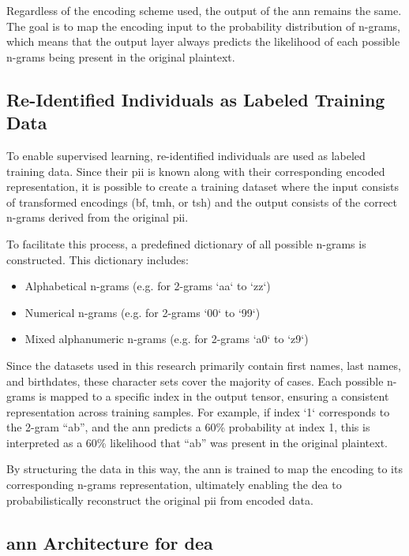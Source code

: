 Regardless of the encoding scheme used, the output of the \ac{ann} remains the same.
The goal is to map the encoding input to the probability distribution of n-grams, which means that the output layer always predicts the likelihood of each possible n-grams being present in the original plaintext.

\subsection{Re-Identified Individuals as Labeled Training Data}

To enable supervised learning, re-identified individuals are used as labeled training data.
Since their \ac{pii} is known along with their corresponding encoded representation, it is possible to create a training dataset where the input consists of transformed encodings (\ac{bf}, \ac{tmh}, or \ac{tsh}) and the output consists of the correct n-grams derived from the original \ac{pii}.

To facilitate this process, a predefined dictionary of all possible n-grams is constructed. This dictionary includes:
\begin{itemize}
   \item Alphabetical n-grams (e.g. for 2-grams `aa` to `zz`)
   \item Numerical n-grams (e.g. for 2-grams `00` to `99`)
   \item Mixed alphanumeric n-grams (e.g. for 2-grams `a0` to `z9`)
\end{itemize}

Since the datasets used in this research primarily contain first names, last names, and birthdates, these character sets cover the majority of cases.
Each possible n-grams is mapped to a specific index in the output tensor, ensuring a consistent representation across training samples.
For example, if index `1` corresponds to the 2-gram \enquote{ab}, and the \ac{ann} predicts a 60\% probability at index 1, this is interpreted as a 60\% likelihood that \enquote{ab} was present in the original plaintext.

By structuring the data in this way, the \ac{ann} is trained to map the encoding to its corresponding n-grams representation, ultimately enabling the \ac{dea} to probabilistically reconstruct the original \ac{pii} from encoded data.

\subsection{\ac{ann} Architecture for \ac{dea}} \label{sec:architecture}

